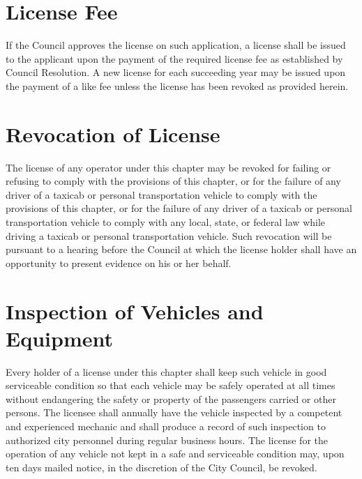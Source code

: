 \section{License Fee}
If the Council approves the license on such application, a license shall be issued to the applicant upon the payment of the required license fee as established by Council Resolution.  A new license for each succeeding year may be issued upon the payment of a like fee unless the license has been revoked as provided herein.

\section{Revocation of License}
The license of any operator under this chapter may be revoked for failing or refusing to comply with the provisions of this chapter, or for the failure of any driver of a taxicab or personal transportation vehicle to comply with the provisions of this chapter, or for the failure of any driver of a taxicab or personal transportation vehicle to comply with any local, state, or federal law while driving a taxicab or personal transportation vehicle.  Such revocation will be pursuant to a hearing before the Council at which the license holder shall have an opportunity to present evidence on his or her behalf.

\section{Inspection of Vehicles and Equipment}
Every holder of a license under this chapter shall keep such vehicle in good serviceable condition so that each vehicle may be safely operated at all times without endangering the safety or property of the passengers carried or other persons.  The licensee shall annually have the vehicle inspected by a competent and experienced mechanic and shall produce a record of such inspection to authorized city personnel during regular business hours.  The license for the operation of any vehicle not kept in a safe and serviceable condition may, upon ten days mailed notice, in the discretion of the City Council, be revoked.

